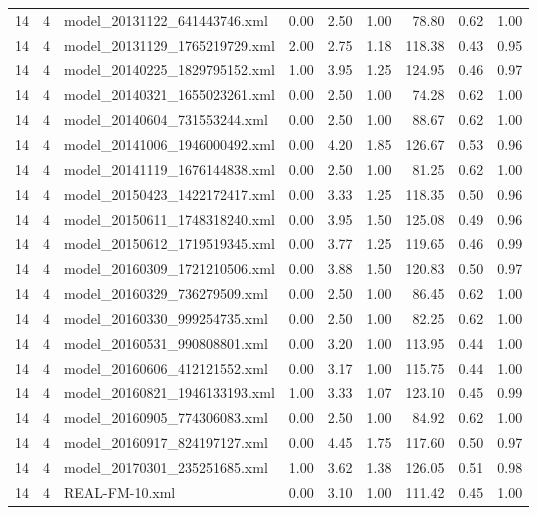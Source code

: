 \begin{table}[ht]
\begin{tabular}{rrlrrrrrr}
   14 &   4 & model\_20131122\_641443746.xml & 0.00 & 2.50 & 1.00 & 78.80 & 0.62 & 1.00 \\ 
   14 &   4 & model\_20131129\_1765219729.xml & 2.00 & 2.75 & 1.18 & 118.38 & 0.43 & 0.95 \\ 
   14 &   4 & model\_20140225\_1829795152.xml & 1.00 & 3.95 & 1.25 & 124.95 & 0.46 & 0.97 \\ 
   14 &   4 & model\_20140321\_1655023261.xml & 0.00 & 2.50 & 1.00 & 74.28 & 0.62 & 1.00 \\ 
   14 &   4 & model\_20140604\_731553244.xml & 0.00 & 2.50 & 1.00 & 88.67 & 0.62 & 1.00 \\ 
   14 &   4 & model\_20141006\_1946000492.xml & 0.00 & 4.20 & 1.85 & 126.67 & 0.53 & 0.96 \\ 
   14 &   4 & model\_20141119\_1676144838.xml & 0.00 & 2.50 & 1.00 & 81.25 & 0.62 & 1.00 \\ 
   14 &   4 & model\_20150423\_1422172417.xml & 0.00 & 3.33 & 1.25 & 118.35 & 0.50 & 0.96 \\ 
   14 &   4 & model\_20150611\_1748318240.xml & 0.00 & 3.95 & 1.50 & 125.08 & 0.49 & 0.96 \\ 
   14 &   4 & model\_20150612\_1719519345.xml & 0.00 & 3.77 & 1.25 & 119.65 & 0.46 & 0.99 \\ 
   14 &   4 & model\_20160309\_1721210506.xml & 0.00 & 3.88 & 1.50 & 120.83 & 0.50 & 0.97 \\ 
   14 &   4 & model\_20160329\_736279509.xml & 0.00 & 2.50 & 1.00 & 86.45 & 0.62 & 1.00 \\ 
   14 &   4 & model\_20160330\_999254735.xml & 0.00 & 2.50 & 1.00 & 82.25 & 0.62 & 1.00 \\ 
   14 &   4 & model\_20160531\_990808801.xml & 0.00 & 3.20 & 1.00 & 113.95 & 0.44 & 1.00 \\ 
   14 &   4 & model\_20160606\_412121552.xml & 0.00 & 3.17 & 1.00 & 115.75 & 0.44 & 1.00 \\ 
   14 &   4 & model\_20160821\_1946133193.xml & 1.00 & 3.33 & 1.07 & 123.10 & 0.45 & 0.99 \\ 
   14 &   4 & model\_20160905\_774306083.xml & 0.00 & 2.50 & 1.00 & 84.92 & 0.62 & 1.00 \\ 
   14 &   4 & model\_20160917\_824197127.xml & 0.00 & 4.45 & 1.75 & 117.60 & 0.50 & 0.97 \\ 
   14 &   4 & model\_20170301\_235251685.xml & 1.00 & 3.62 & 1.38 & 126.05 & 0.51 & 0.98 \\ 
   14 &   4 & REAL-FM-10.xml & 0.00 & 3.10 & 1.00 & 111.42 & 0.45 & 1.00 \\ 

\end{tabular}
\end{table}
